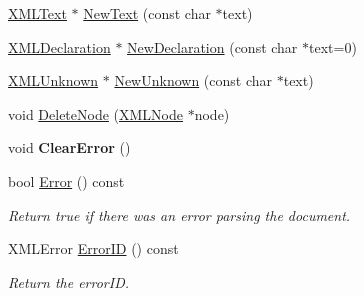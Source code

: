 \begin{DoxyCompactItemize}
\item 
\hyperlink{classCPlantBox_1_1tinyxml2_1_1XMLText}{X\+M\+L\+Text} $\ast$ \hyperlink{classCPlantBox_1_1tinyxml2_1_1XMLDocument_a08aab2b2f1d62fd2597bb42d9b9762b2}{New\+Text} (const char $\ast$text)
\item 
\hyperlink{classCPlantBox_1_1tinyxml2_1_1XMLDeclaration}{X\+M\+L\+Declaration} $\ast$ \hyperlink{classCPlantBox_1_1tinyxml2_1_1XMLDocument_af1f51f94b8132e17fad999cf402dcef6}{New\+Declaration} (const char $\ast$text=0)
\item 
\hyperlink{classCPlantBox_1_1tinyxml2_1_1XMLUnknown}{X\+M\+L\+Unknown} $\ast$ \hyperlink{classCPlantBox_1_1tinyxml2_1_1XMLDocument_af584970bff0c37f37934ba804bfd7889}{New\+Unknown} (const char $\ast$text)
\item 
void \hyperlink{classCPlantBox_1_1tinyxml2_1_1XMLDocument_ab6a934839aa91d69977e874fb7bb29be}{Delete\+Node} (\hyperlink{classCPlantBox_1_1tinyxml2_1_1XMLNode}{X\+M\+L\+Node} $\ast$node)
\item 
\mbox{\label{classCPlantBox_1_1tinyxml2_1_1XMLDocument_a8c3d59b845c5b96856e36bec501d2252}} 
void {\bfseries Clear\+Error} ()
\item 
\mbox{\label{classCPlantBox_1_1tinyxml2_1_1XMLDocument_ac491a05b9790cdc7a6518d500e0a3891}} 
bool \hyperlink{classCPlantBox_1_1tinyxml2_1_1XMLDocument_ac491a05b9790cdc7a6518d500e0a3891}{Error} () const
\begin{DoxyCompactList}\small\item\em Return true if there was an error parsing the document. \end{DoxyCompactList}\item 
\mbox{\label{classCPlantBox_1_1tinyxml2_1_1XMLDocument_ad49779bae12f71a8c945761b00761d14}} 
X\+M\+L\+Error \hyperlink{classCPlantBox_1_1tinyxml2_1_1XMLDocument_ad49779bae12f71a8c945761b00761d14}{Error\+ID} () const
\begin{DoxyCompactList}\small\item\em Return the error\+ID. \end{DoxyCompactList}\item 
\mbox{\label{classCPlantBox_1_1tinyxml2_1_1XMLDocument_a01f92449be0cb4958ee371339a0cda3c}} 

\end{DoxyCompactItemize}
